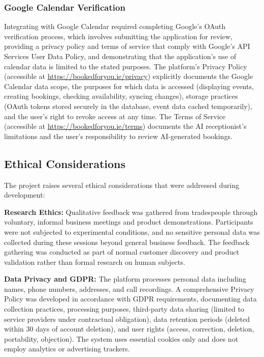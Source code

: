 \documentclass[conference]{IEEEtran}
\begin{document}
\subsubsection{Google Calendar Verification}

Integrating with Google Calendar required completing Google's OAuth verification process, which involves submitting the application for review, providing a privacy policy and terms of service that comply with Google's API Services User Data Policy, and demonstrating that the application's use of calendar data is limited to the stated purposes. The platform's Privacy Policy (accessible at \url{https://bookedforyou.ie/privacy}) explicitly documents the Google Calendar data scope, the purposes for which data is accessed (displaying events, creating bookings, checking availability, syncing changes), storage practices (OAuth tokens stored securely in the database, event data cached temporarily), and the user's right to revoke access at any time. The Terms of Service (accessible at \url{https://bookedforyou.ie/terms}) documents the AI receptionist's limitations and the user's responsibility to review AI-generated bookings.

\subsection{Ethical Considerations}

The project raises several ethical considerations that were addressed during development:

\textbf{Research Ethics:} Qualitative feedback was gathered from tradespeople through voluntary, informal business meetings and product demonstrations. Participants were not subjected to experimental conditions, and no sensitive personal data was collected during these sessions beyond general business feedback. The feedback gathering was conducted as part of normal customer discovery and product validation rather than formal research on human subjects.

\textbf{Data Privacy and GDPR:} The platform processes personal data including names, phone numbers, addresses, and call recordings. A comprehensive Privacy Policy was developed in accordance with GDPR requirements, documenting data collection practices, processing purposes, third-party data sharing (limited to service providers under contractual obligation), data retention periods (deleted within 30 days of account deletion), and user rights (access, correction, deletion, portability, objection). The system uses essential cookies only and does not employ analytics or advertising trackers.
\end{document}
